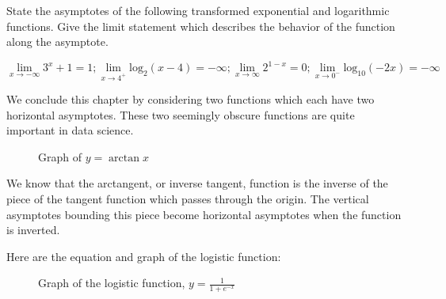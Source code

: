 \begin{Exercise}[title=Limits Practice 2, label=limits2]
  State the asymptotes of the following transformed exponential and logarithmic functions. Give the limit statement which describes the behavior of the function along the asymptote.
  \vspace{40mm}
\end{Exercise}
\begin{Answer}[ref=limits2] 
	$$ \lim_{x \rightarrow -\infty} 3^x + 1 = 1; \lim_{x \rightarrow 4^+} \text{log}_2 (x-4) = -\infty; \lim_{x \rightarrow \infty} 2^{1-x} = 0; \lim_{x \rightarrow 0^-} \text{log}_{10} (-2x) = -\infty $$
\end{Answer}

We conclude this chapter by considering two functions which each have two horizontal asymptotes. These two seemingly obscure functions are quite important in data science.

\begin{figure}[htbp]
  \centering
  \caption{Graph of \(y = \arctan x\)}
\end{figure}

We know that the arctangent, or inverse tangent, function is the inverse of the piece of the tangent function which passes through the origin. The vertical asymptotes bounding this piece become horizontal asymptotes when the function is inverted.

Here are the equation and graph of the logistic function:

\begin{figure}[htbp]
  \centering
  \caption{Graph of the logistic function, $ y = \frac{1}{1 + e^{-x}} $}
\end{figure}

